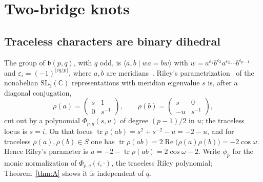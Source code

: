 \documentclass[11pt,reqno]{amsart}
\theoremstyle{plain}
\theoremstyle{definition}
\newcommand{\C}{\mathbb{C}}
\newcommand{\tr}{\operatorname{tr}}
\newcommand{\bp}{\mathfrak{b}}
\begin{document}
\section{Two-bridge knots}\label{sec:2bridge}

\subsection{Traceless characters are binary dihedral}
The group of $\bp(p,q)$, with $q$ odd, is $\langle a,b\mid wa=bw\rangle$ with
$w=a^{\varepsilon_1}b^{\varepsilon_2}a^{\varepsilon_3}\cdots b^{\varepsilon_{p-1}}$ and
$\varepsilon_i=(-1)^{\lfloor iq/p\rfloor}$, where $a,b$ are meridians~\cite{Riley}. Riley's
parametrization~\cite{Riley} of the nonabelian $\mathrm{SL}_2(\C)$ representations with meridian
eigenvalue $s$ is, after a diagonal conjugation,
\[
\rho(a)=\begin{pmatrix}s&1\\0&s^{-1}\end{pmatrix},\qquad
\rho(b)=\begin{pmatrix}s&0\\-u&s^{-1}\end{pmatrix},
\]
cut out by a polynomial $\Phi_{p,q}(s,u)$ of degree $(p-1)/2$ in $u$; the traceless locus is $s=i$. On
that locus $\tr\rho(ab)=s^2+s^{-2}-u=-2-u$, and for traceless $\rho(a),\rho(b)\in S$ one has
$\tr\rho(ab)=2\operatorname{Re}\bigl(\rho(a)\rho(b)\bigr)=-2\cos\omega$. Hence Riley's parameter is
$u=-2-\tr\rho(ab)=2\cos\omega-2$. Write $\phi_p$ for the monic normalization of $\Phi_{p,q}(i,\cdot)$, the
traceless Riley polynomial; Theorem~\ref{thm:A} shows it is independent of $q$.
\end{document}
